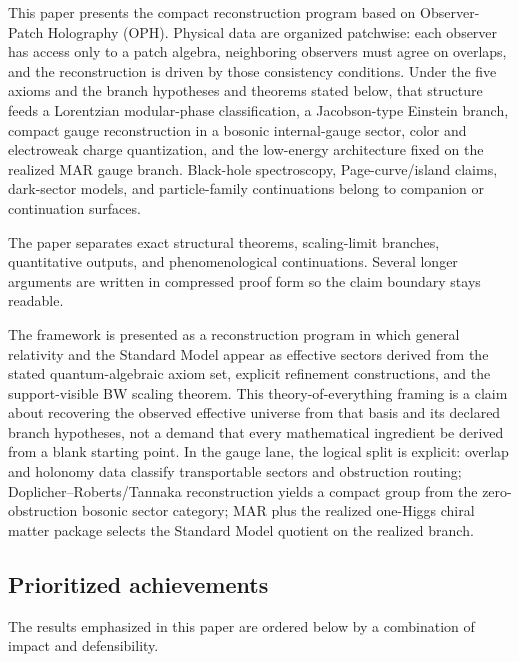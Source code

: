 \documentclass[11pt]{article}
\begin{document}
This paper presents the compact reconstruction program based on Observer-Patch Holography (OPH).
Physical data are organized patchwise: each observer has access only to a patch algebra,
neighboring observers must agree on overlaps, and the reconstruction is driven by those
consistency conditions. Under the five axioms and the branch hypotheses and theorems stated below,
that structure feeds a Lorentzian modular-phase classification, a Jacobson-type Einstein branch,
compact gauge reconstruction in a bosonic internal-gauge sector, color and electroweak charge
quantization, and the low-energy architecture fixed on the realized MAR gauge branch.
Black-hole spectroscopy, Page-curve/island claims, dark-sector models, and particle-family
continuations belong to companion or continuation surfaces.

The paper separates exact structural theorems, scaling-limit branches, quantitative outputs, and phenomenological continuations. Several longer arguments are written in compressed proof form so the claim boundary stays readable.

The framework is presented as a reconstruction program in which general relativity and the Standard Model appear as effective sectors derived from the stated quantum-algebraic axiom set, explicit refinement constructions, and the support-visible BW scaling theorem. This theory-of-everything framing is a claim about recovering the observed effective universe from that basis and its declared branch hypotheses, not a demand that every mathematical ingredient be derived from a blank starting point. In the gauge lane, the logical split is explicit: overlap and holonomy data classify transportable sectors and obstruction routing; Doplicher--Roberts/Tannaka reconstruction yields a compact group from the zero-obstruction bosonic sector category; MAR plus the realized one-Higgs chiral matter package selects the Standard Model quotient on the realized branch.

\subsection*{Prioritized achievements}

The results emphasized in this paper are ordered below by a combination of impact and defensibility.
\end{document}
